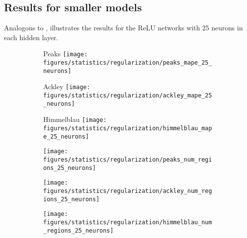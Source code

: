 \begin{appendices}
\section{Results for smaller models}
Analogous to ,  illustrates the results for the ReLU networks with 25 neurons in each hidden layer.
\begin{figure}[h]
    \centering
    \begin{subfigure}{.32\linewidth}
        \centering
        Peaks
        \texttt{[image: figures/statistics/regularization/peaks\_mape\_25\_neurons]}
    \end{subfigure}
    \begin{subfigure}{.32\linewidth}
        \centering
        Ackley
        \texttt{[image: figures/statistics/regularization/ackley\_mape\_25\_neurons]}
    \end{subfigure}
    \begin{subfigure}{.32\linewidth}
        \centering
        Himmelblau
        \texttt{[image: figures/statistics/regularization/himmelblau\_mape\_25\_neurons]}
    \end{subfigure}
    
    \begin{subfigure}{.32\linewidth}
        \centering
        \texttt{[image: figures/statistics/regularization/peaks\_num\_regions\_25\_neurons]}
    \end{subfigure}
    \begin{subfigure}{.32\linewidth}
        \centering
        \texttt{[image: figures/statistics/regularization/ackley\_num\_regions\_25\_neurons]}
    \end{subfigure}
    \begin{subfigure}{.32\linewidth}
        \centering
        \texttt{[image: figures/statistics/regularization/himmelblau\_num\_regions\_25\_neurons]}
    \end{subfigure}


\end{figure}
\end{appendices}
